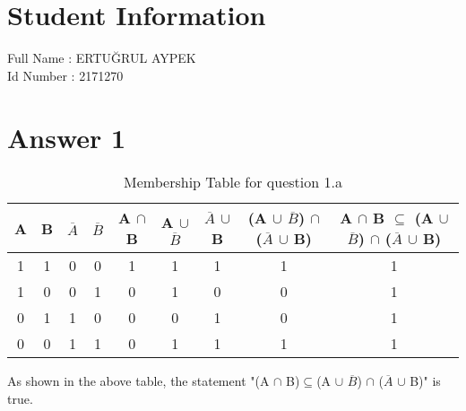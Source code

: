 \documentclass[12pt]{article}
\begin{document}
\section*{Student Information } 
Full Name : ERTUĞRUL AYPEK \\
Id Number : 2171270 \\

\section*{Answer 1}
\begin{table}[H]
\small
\centering
\caption{ Membership Table for question 1.a }

\begin{tabular}{|c|c|c|c|c|c|c|c|c|}	%
\hline 							%
\textbf{A} & \textbf{B} & \textbf{$\overline{A}$} & \textbf{$\overline{B}$} & \textbf{A $\cap$ B} & \textbf{A $\cup$ $\overline{B}$} & \textbf{$\overline{A}$ $\cup$ B} & \textbf{(A $\cup$ $\overline{B}$) $\cap$ ($\overline{A}$ $\cup$ B)} & \textbf{A $\cap$ B $\subseteq$ (A $\cup$ $\overline{B}$) $\cap$ ($\overline{A}$ $\cup$ B)}\\
\hline 
 
1 & 1 & 0 & 0 & 1 & 1 & 1 & 1 & 1 \\ \hline 
1 & 0 & 0 & 1 & 0 & 1 & 0 & 0 & 1 \\ \hline
0 & 1 & 1 & 0 & 0 & 0 & 1 & 0 & 1 \\ \hline
0 & 0 & 1 & 1 & 0 & 1 & 1 & 1 & 1 \\
\hline 

\end{tabular}
\end{table}

As shown in the above table, the statement "(A $\cap$ B)$\subseteq$(A $\cup$ $\overline{B}$) $\cap$ ($\overline{A}$ $\cup$ B)" is true.
\\
\\
\\
 
\end{document}
